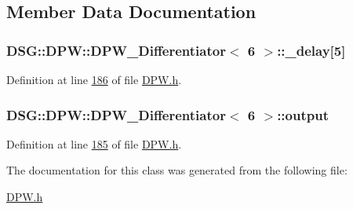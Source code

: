 \subsection{Member Data Documentation}
\hypertarget{class_d_s_g_1_1_d_p_w_1_1_d_p_w___differentiator_3_016_01_4_a8f3e45aa44791b711f6e71aff92505ca}{
\subsubsection[{\+\_\+delay}]{ {\bf D\+S\+G\+::\+D\+P\+W\+::\+D\+P\+W\+\_\+\+Differentiator}$<$ 6 $>$\+::\+\_\+delay\mbox{[}5\mbox{]}\hspace{0.3cm}{\ttfamily [protected]}}}\label{class_d_s_g_1_1_d_p_w_1_1_d_p_w___differentiator_3_016_01_4_a8f3e45aa44791b711f6e71aff92505ca}


Definition at line \hyperlink{_d_p_w_8h_source_l00186}{186} of file \hyperlink{_d_p_w_8h_source}{D\+P\+W.\+h}.

\hypertarget{class_d_s_g_1_1_d_p_w_1_1_d_p_w___differentiator_3_016_01_4_a6939d53801d66571b5935bcd5561548a}{
\subsubsection[{output}]{ {\bf D\+S\+G\+::\+D\+P\+W\+::\+D\+P\+W\+\_\+\+Differentiator}$<$ 6 $>$\+::output\hspace{0.3cm}{\ttfamily [protected]}}}\label{class_d_s_g_1_1_d_p_w_1_1_d_p_w___differentiator_3_016_01_4_a6939d53801d66571b5935bcd5561548a}


Definition at line \hyperlink{_d_p_w_8h_source_l00185}{185} of file \hyperlink{_d_p_w_8h_source}{D\+P\+W.\+h}.



The documentation for this class was generated from the following file\+:\begin{DoxyCompactItemize}
\item 
\hyperlink{_d_p_w_8h}{D\+P\+W.\+h}\end{DoxyCompactItemize}
